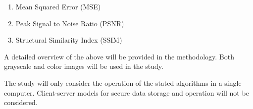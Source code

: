 \begin{enumerate}
		\item Mean Squared Error (MSE)
		\item Peak Signal to Noise Ratio (PSNR)
		\item Structural Similarity Index (SSIM)
\end{enumerate}
A detailed overview of the above will be provided in the methodology.
Both grayscale and color images will be used in the study.

The study will only consider the operation of the stated algorithms in a single computer. Client-server models for secure data storage and operation will not be considered.
